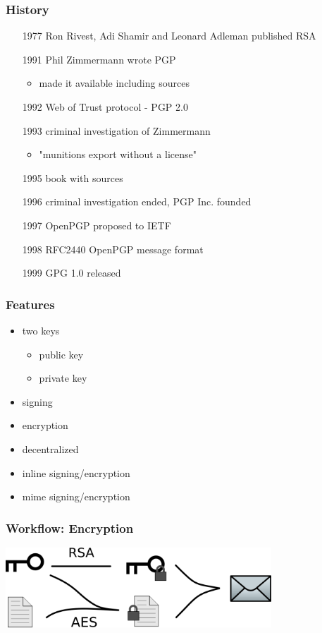 \begin{frame}[t]
   \frametitle{History}
   \begin{itemize}
      \item[1977] Ron Rivest, Adi Shamir and Leonard Adleman published RSA
      \item[1991] Phil Zimmermann wrote PGP
      \begin{itemize}
         \item made it available including sources
      \end{itemize}
      \item[1992] Web of Trust protocol - PGP 2.0
      \item[1993] criminal investigation of Zimmermann
      \begin{itemize}
         \item "munitions export without a license"
      \end{itemize}
      \item[1995] book with sources
      \item[1996] criminal investigation ended, PGP Inc. founded
      \item[1997] OpenPGP proposed to IETF
      \item[1998] RFC2440 OpenPGP message format
      \item[1999] GPG 1.0 released
   \end{itemize}
\end{frame}

\begin{frame}[t]
   \frametitle{Features}
   \begin{itemize}
      \item two keys
      \begin{itemize}
         \item public key
         \item private key
      \end{itemize}
      \item signing
      \item encryption
      \item decentralized
      \item inline signing/encryption
      \item mime signing/encryption
   \end{itemize}
\end{frame}

\begin{frame}
   \frametitle{Workflow: Encryption}
   \begin{center}
   \includegraphics[height=3cm]{encrypt-pgp}
   \end{center}
\end{frame}

